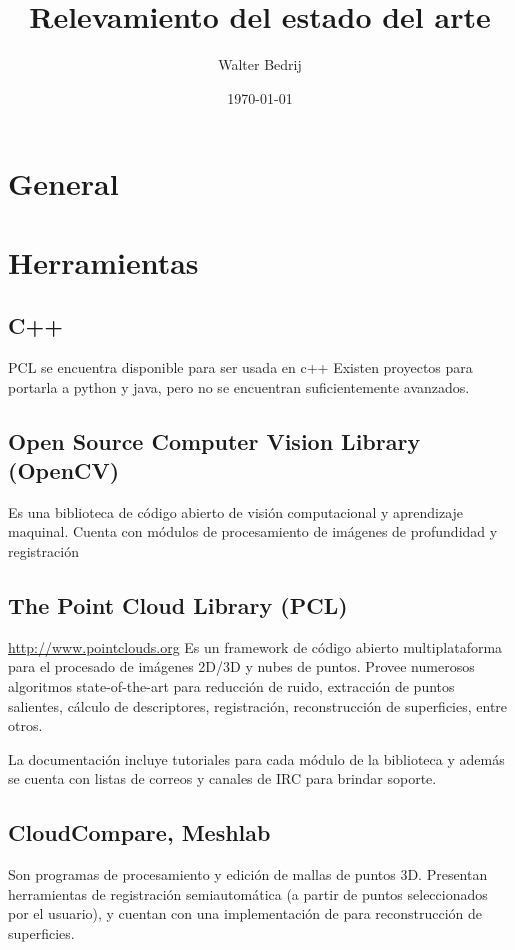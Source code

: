 \documentclass{pfc}
\title{Relevamiento del estado del arte}
\author{Walter Bedrij}
\date{\today}
\begin{document}
	\section{General}

	\section{Herramientas}
		\subsection{C++}
			PCL se encuentra disponible para ser usada en c++
			Existen proyectos para portarla a python y java,
			pero no se encuentran suficientemente avanzados.
		\subsection{Open Source Computer Vision Library (OpenCV)}
			Es una biblioteca de código abierto de
			visión computacional y aprendizaje maquinal.
			Cuenta con módulos de
			procesamiento de imágenes de profundidad
			y registración


		\subsection{The Point Cloud Library (PCL)}
			\url{http://www.pointclouds.org}
			Es un framework de código abierto multiplataforma para el procesado de imágenes 2D/3D y nubes de puntos.
			Provee numerosos algoritmos state-of-the-art %
			para reducción de ruido, extracción de puntos salientes,
			cálculo de descriptores, registración,
			reconstrucción de superficies, entre otros.

			La documentación incluye tutoriales para cada módulo de la biblioteca
			y además se cuenta con listas de correos
			y canales de IRC para brindar soporte.



		\subsection{CloudCompare, Meshlab}
			Son programas de procesamiento y edición de mallas de puntos 3D.
			Presentan herramientas de registración semiautomática (a partir de
			puntos seleccionados por el usuario), y cuentan con una
			implementación de \cite{poisson-reconstruction} para reconstrucción
			de superficies.
\end{document}
